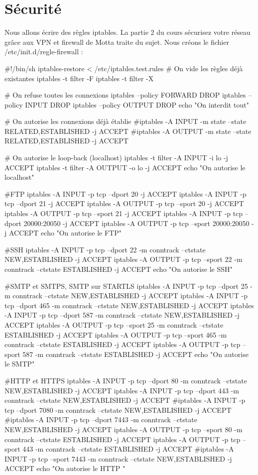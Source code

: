 \documentclass[a4paper,12pt,french]{report} %
\begin{document}
\section{ Sécurité}
Nous allons écrire des règles iptables. La partie 2 du cours sécurisez votre réseau grâce aux VPN et firewall de Motta  \cite{ref17} traite du sujet. Nous créons le fichier /etc/init.d/regle-firewall :
\begin{exempleConsole}
#!/bin/sh
iptables-restore < /etc/iptables.test.rules
# On vide les règles déjà existantes
iptables -t filter -F
iptables -t filter -X

# On refuse toutes les connexions
iptables --policy FORWARD DROP
iptables --policy INPUT  DROP
iptables --policy OUTPUT  DROP
echo "On interdit tout"


# On autorise les connexions déjà établie
#iptables -A INPUT -m state --state RELATED,ESTABLISHED -j ACCEPT
#iptables -A OUTPUT -m state --state RELATED,ESTABLISHED -j ACCEPT

# On autorise le loop-back (localhost)
iptables -t filter -A INPUT -i lo -j ACCEPT
iptables -t filter -A OUTPUT -o lo -j ACCEPT
echo "On autorise le localhost"

#FTP
iptables -A INPUT -p tcp --dport 20 -j ACCEPT
iptables -A INPUT -p tcp --dport 21 -j ACCEPT
iptables -A OUTPUT -p tcp --sport 20 -j ACCEPT
iptables -A OUTPUT -p tcp --sport 21 -j ACCEPT
iptables -A INPUT -p tcp --dport 20000:20050 -j ACCEPT 
iptables -A OUTPUT -p tcp --sport 20000:20050 -j ACCEPT
echo "On autorise le FTP"

#SSH
iptables -A INPUT -p tcp --dport 22 -m conntrack --ctstate NEW,ESTABLISHED -j ACCEPT
iptables -A OUTPUT -p tcp --sport 22 -m conntrack --ctstate ESTABLISHED -j ACCEPT
echo "On autorise le SSH"

#SMTP et SMTPS, SMTP sur STARTLS
iptables -A INPUT -p tcp --dport 25 -m conntrack --ctstate NEW,ESTABLISHED -j ACCEPT
iptables -A INPUT -p tcp --dport 465 -m conntrack --ctstate NEW,ESTABLISHED -j ACCEPT
iptables -A INPUT -p tcp --dport 587 -m conntrack --ctstate NEW,ESTABLISHED -j ACCEPT
iptables -A OUTPUT -p tcp --sport 25 -m conntrack --ctstate ESTABLISHED -j ACCEPT
iptables -A OUTPUT -p tcp --sport 465 -m conntrack --ctstate ESTABLISHED -j ACCEPT
iptables -A OUTPUT -p tcp --sport 587 -m conntrack --ctstate ESTABLISHED -j ACCEPT
echo "On autorise le SMTP"

#HTTP et HTTPS
iptables -A INPUT -p tcp --dport 80 -m conntrack --ctstate NEW,ESTABLISHED -j ACCEPT
iptables -A INPUT -p tcp --dport 443 -m conntrack --ctstate NEW,ESTABLISHED -j ACCEPT
#iptables -A INPUT -p tcp --dport 7080 -m conntrack --ctstate NEW,ESTABLISHED -j ACCEPT
#iptables -A INPUT -p tcp --dport 7443 -m conntrack --ctstate NEW,ESTABLISHED -j ACCEPT
iptables -A OUTPUT -p tcp --sport 80 -m conntrack --ctstate ESTABLISHED -j ACCEPT
iptables -A OUTPUT -p tcp --sport 443 -m conntrack --ctstate ESTABLISHED -j ACCEPT
#iptables -A INPUT -p tcp --sport 7443 -m conntrack --ctstate NEW,ESTABLISHED -j ACCEPT
echo "On autorise le HTTP "


\end{exempleConsole}
\end{document}
